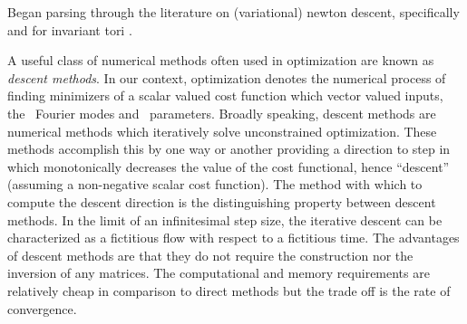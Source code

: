 Began parsing through the literature on (variational) {newton descent},
specifically  and for invariant tori
.

A useful class of numerical methods often used in optimization are known
as \textit{descent methods}. In our context, optimization denotes the numerical process
of finding minimizers of a scalar valued cost function which vector valued inputs, the \spt\
Fourier modes and \spt\ parameters. Broadly speaking, descent methods are numerical methods
which iteratively solve unconstrained optimization. These methods accomplish this by one
way or another providing a direction to step in which monotonically decreases the value of
the cost functional, hence ``descent'' (assuming a non-negative scalar cost function).
The method with which to compute the descent direction is the distinguishing property
between descent methods. In the limit of an infinitesimal step size, the iterative descent
can be characterized as a fictitious flow with respect to a fictitious time\rf{LCC06}.
The advantages of descent methods are that they do not require the construction nor
the inversion of any matrices. The computational and memory requirements
are relatively cheap in comparison to direct methods but the trade off is the
rate of convergence.



